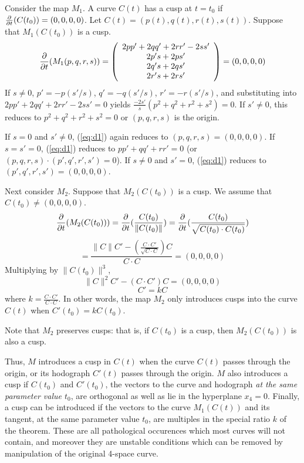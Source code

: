 Consider the map $M_1$.
A curve $C(t)$ has a cusp at $t=t_0$ if $\frac{\partial}{\partial t}(C(t_0)) = (0,0,0,0)$.
Let $C(t) = (p(t),q(t),r(t),s(t))$.
Suppose that $M_1(C(t_0))$ is a cusp.
\begin{equation}
\label{eq:d1}
\frac{\partial}{\partial t}(M_1(p,q,r,s)) = 
\left( \begin{array}{c}
	2pp' + 2qq' + 2rr'  - 2ss' \\
	2p's + 2ps' \\
	2q's + 2qs' \\
        2r's + 2rs' 
\end{array} \right)
	   = (0,0,0,0)
\end{equation}
If $s \neq 0$,
$       p' = -p(s'/s)$,
$       q' = -q(s'/s)$,
$       r' = -r(s'/s)$,
and substituting into $2pp' + 2qq' + 2rr'  - 2ss' = 0$ yields
$        \frac{-2s'}{s}(p^2+q^2+r^2+s^2) = 0 $.
If $s'\neq 0$, this reduces to
$ p^2 + q^2 + r^2 + s^2 = 0$
or $(p,q,r,s)$ is the origin.

If $s = 0$ and $s' \neq 0$,
(\ref{eq:d1}) again reduces to $(p,q,r,s) = (0,0,0,0)$.
If $s = s' = 0$,
(\ref{eq:d1}) reduces to $pp' + qq' + rr' = 0$ 
(or $(p,q,r,s) \cdot (p',q',r',s') = 0$).
If $s \neq 0$ and $s' = 0$,
(\ref{eq:d1}) reduces to $(p',q',r',s') = (0,0,0,0)$.

Next consider $M_2$.
Suppose that $M_2(C(t_0))$ is a cusp.
We assume that $C(t_0) \neq (0,0,0,0)$.
\[ 
\frac{\partial}{\partial t}(M_2(C(t_0))) 
= \frac{\partial}{\partial t}(\frac{C(t_0)}{\|C(t_0)\|})
= \frac{\partial}{\partial t}(\frac{C(t_0)}{\sqrt{C(t_0) \cdot C(t_0)}})
\]
\[
= \frac{\|C\| C' - (\frac{C \cdot C'}{\sqrt{C \cdot C}}) C}{C \cdot C}
= (0,0,0,0)
\]
Multiplying by $\|C(t_0)\|^3$,
\[
\|C\|^2 C' - (C \cdot C') C = (0,0,0,0)
\]
\[
C' = kC
\]
where $k = \frac{C \cdot C'}{C \cdot C}$.
In other words,
the map $M_2$ only introduces cusps into the curve $C(t)$ when
$C'(t_0) = kC(t_0)$.

Note that $M_2$ preserves cusps: that is, if $C(t_0)$ is a cusp,
then $M_2(C(t_0))$ is also a cusp.
\QED

Thus, $M$ introduces a cusp in $C(t)$
when the curve $C(t)$ passes through
the origin, or its hodograph $C'(t)$ passes through the origin.
$M$ also introduces a cusp if $C(t_0)$ and $C'(t_0)$, 
the vectors to the curve and hodograph {\em at the same parameter value
$t_0$}, are orthogonal as well as lie in the hyperplane $x_4=0$.
Finally, a cusp can be introduced if the vectors to the
curve $M_1(C(t))$ and its tangent, at the same parameter value $t_0$, 
are multiples in the special ratio $k$ of the theorem.
These are all pathological occurences which most curves will not
contain, and moreover they are unstable conditions which can be
removed by manipulation of the original 4-space curve.

